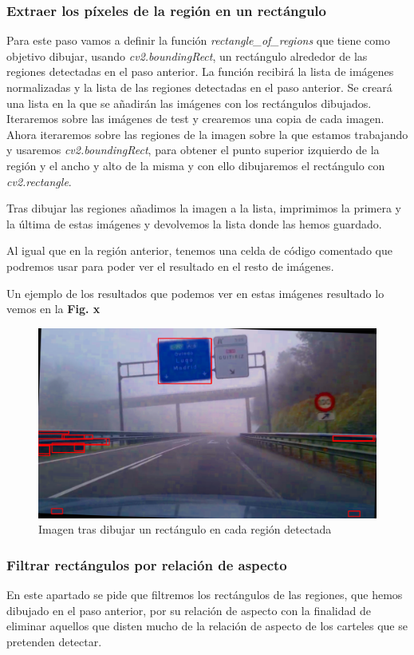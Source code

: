 \documentclass[a4paper, 12pt]{article}
\begin{document}
\subsubsection{Extraer los píxeles de la región en un rectángulo}
Para este paso vamos a definir la función \textit{rectangle\_of\_regions} que tiene como objetivo dibujar, usando \textit{cv2.boundingRect}, un rectángulo alrededor de las regiones detectadas en el paso anterior. La función recibirá la lista de imágenes normalizadas y la lista de las regiones detectadas en el paso anterior.
Se creará una lista en la que se añadirán las imágenes con los rectángulos dibujados. Iteraremos sobre las imágenes de test y crearemos una copia de cada imagen. Ahora iteraremos sobre las regiones de la imagen sobre la que estamos trabajando y usaremos \textit{cv2.boundingRect}, para obtener el punto superior izquierdo de la región y el ancho y alto de la misma y con ello dibujaremos el rectángulo con \textit{cv2.rectangle}. 


Tras dibujar las regiones añadimos la imagen a la lista, imprimimos la primera y la última de estas imágenes y devolvemos la lista donde las hemos guardado. 


Al igual que en la región anterior, tenemos una celda de código comentado que podremos usar para poder ver el resultado en el resto de imágenes.

Un ejemplo de los resultados que podemos ver en estas imágenes resultado lo vemos en la \textbf{Fig. x}
\begin{figure}[h]
	\centering
	\includegraphics[width=0.6\linewidth]{img/Rectangulos}
	\caption{Imagen tras dibujar un rectángulo en cada región detectada}
	\label{fig:Rectangulos}
\end{figure}

\subsubsection{Filtrar rectángulos por relación de aspecto}
En este apartado se pide que filtremos los rectángulos de las regiones, que hemos dibujado en el paso anterior, por su relación de aspecto con la finalidad de eliminar aquellos que disten mucho de la relación de aspecto de los carteles que se pretenden detectar. 
\end{document}
